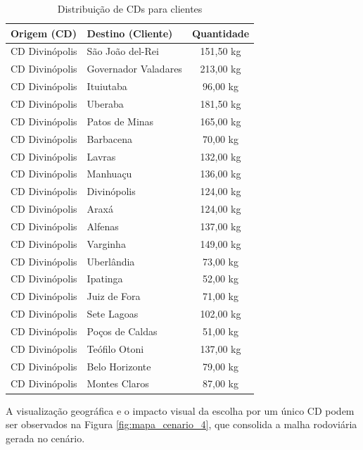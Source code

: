 \documentclass[a4paper,11pt]{article}
\begin{document}
\begin{table}[H]
\centering
\begin{tabular}{llc}
\hline
\textbf{Origem (CD)} & \textbf{Destino (Cliente)} & \textbf{Quantidade} \\ \hline
CD Divinópolis  & São João del-Rei          & 151,50 kg     \\
CD Divinópolis  & Governador Valadares      & 213,00 kg     \\
CD Divinópolis  & Ituiutaba                 &  96,00 kg    \\
CD Divinópolis  & Uberaba                   & 181,50 kg     \\
CD Divinópolis  & Patos de Minas            & 165,00 kg     \\
CD Divinópolis  & Barbacena                 &  70,00 kg    \\
CD Divinópolis  & Lavras                    & 132,00 kg     \\
CD Divinópolis  & Manhuaçu                  & 136,00 kg     \\
CD Divinópolis  & Divinópolis               & 124,00 kg     \\
CD Divinópolis  & Araxá                     & 124,00 kg     \\
CD Divinópolis  & Alfenas                   & 137,00 kg     \\
CD Divinópolis  & Varginha                  & 149,00 kg     \\
CD Divinópolis  & Uberlândia                &  73,00 kg    \\
CD Divinópolis  & Ipatinga                  &  52,00 kg    \\
CD Divinópolis  & Juiz de Fora              &  71,00 kg    \\
CD Divinópolis  & Sete Lagoas               & 102,00 kg     \\
CD Divinópolis  & Poços de Caldas           &  51,00 kg    \\
CD Divinópolis  & Teófilo Otoni             & 137,00 kg     \\
CD Divinópolis  & Belo Horizonte            &  79,00 kg    \\
CD Divinópolis  & Montes Claros             &  87,00 kg    \\
\hline
\end{tabular}
\caption{Distribuição de CDs para clientes}
\label{tab:cenario4_cd_cli}
\end{table}

A visualização geográfica e o impacto visual da escolha por um único CD podem ser observados na Figura \ref{fig:mapa_cenario_4}, que consolida a malha rodoviária gerada no cenário.
\end{document}
